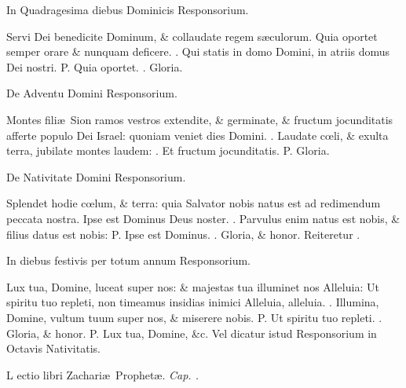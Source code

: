 \documentclass[letter,11pt]{book}
\makeatletter
\DeclareRobustCommand{\Vbar}{\vers@resp{-0.1em}{V}}
\DeclareRobustCommand{\Rbar}{\vers@resp{0pt}{R}}
\newcommand{\vers@resp@sym}{\raisebox{0.2ex}{\rotatebox[origin=c]{-20}{$\m@th\rceil$}}}
\newcommand{\vers@resp}[2]{%
  {\ooalign{\hidewidth\kern#1\vers@resp@sym\hidewidth\cr#2\cr}}%
}%
\def\P{\color{Red} P. \color{black}}
\def\V{\color{Red} \Vbar . \color{black}}
\def\R{\color{Red} \Rbar . \color{black}}
\makeatother
\begin{document}
\begin{multicols*}{2}
\vspace{-.75em} \begin{center} \color{Red} In Quadragesima diebus Dominicis Responsorium. \color{black} \end{center} \vspace{-.75em}
\par \noindent Servi Dei benedicite Dominum, \& collaudate regem s\ae culorum. Quia oportet semper orare \& nunquam deficere. \V Qui statis in domo Domini, in atriis domus Dei nostri. \P Quia oportet. \V Gloria.
\vspace{-.75em} \begin{center} \color{Red} De Adventu Domini Responsorium. \color{black} \end{center} \vspace{-.75em}
\par \noindent Montes fili\ae \ Sion ramos vestros extendite, \& germinate, \& fructum jocunditatis afferte populo Dei Israel: quoniam veniet dies Domini. \V Laudate c\oe li, \& exulta terra, jubilate montes laudem: \V Et fructum jocunditatis. \P Gloria.
\vspace{-.75em} \begin{center} \color{Red} De Nativitate Domini Responsorium. \color{black} \end{center} \vspace{-.75em}
\par \noindent Splendet hodie c\oe lum, \& terra: quia Salvator nobis natus est ad redimendum peccata nostra. Ipse est Dominus Deus noster. \V Parvulus enim natus est nobis, \& filius datus est nobis: \P Ipse est Dominus. \V Gloria, \& honor. \color{Red} Reiteretur \R \color{black}
\vspace{-.75em} \begin{center} \color{Red} In diebus festivis per totum annum Responsorium. \color{black} \end{center} \vspace{-.75em}
\par \noindent Lux tua, Domine, luceat super nos: \& majestas tua illuminet nos Alleluia: Ut spiritu tuo repleti, non timeamus insidias inimici Alleluia, alleluia. \V Illumina, Domine, vultum tuum super nos, \& miserere nobis. \P Ut spiritu tuo repleti. \V Gloria, \& honor. \P Lux tua, Domine, \&c. \color{Red} Vel dicatur istud Responsorium in Octavis Nativitatis. \color{black}
\vspace{-.75em} \begin{center} \color{Red} L\color{black} ectio libri Zachari\ae \ Prophet\ae . \itshape Cap. . \end{center} \vspace{-.75em}

\end{multicols*}
\end{document}
